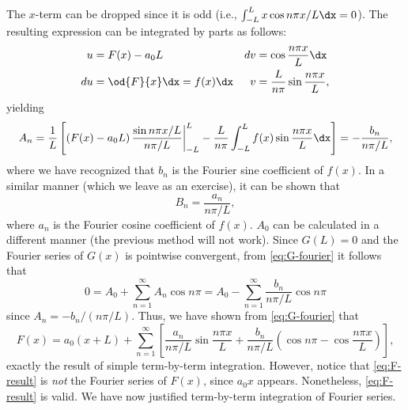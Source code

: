 The $x$-term can be dropped since it is odd (i.e., $\int_{-L}^{L} x\cos n\pi x/L \dx = 0$).  The resulting expression can be integrated by parts as follows:
\begin{align*}
u &= F(x) - a_0 L & dv &= \cos\frac{n\pi x}{L}\dx \\
du &= \od{F}{x}\dx = f(x)\dx & v &= \frac{L}{n\pi}\sin\frac{n\pi x}{L},
\end{align*}
yielding
\begin{equation}
\label{eq:An-proof}
A_n = \frac{1}{L}\left[\left(F(x) - a_0 L\right)\frac{\sin n\pi x/L}{n\pi/L}\bigg|_{-L}^{L} - \frac{L}{n\pi}\int_{-L}^{L} f(x)\sin\frac{n\pi x}{L}\dx\right] = -\frac{b_n}{n\pi/L},
\end{equation}
where we have recognized that $b_n$ is the Fourier sine coefficient of $f(x)$.  In a similar manner (which we leave as an exercise), it can be shown that
\[
B_n = \frac{a_n}{n\pi/L},
\]
where $a_n$ is the Fourier cosine coefficient of $f(x)$.  $A_0$ can be calculated in a different manner (the previous method will not work).  Since $G(L) = 0$ and the Fourier series of $G(x)$ is pointwise convergent, from \eqref{eq:G-fourier} it follows that
\[
0 = A_0 + \sum_{n=1}^{\infty} A_n \cos n\pi = A_0 - \sum_{n=1}^{\infty}\frac{b_n}{n\pi/L}\cos n\pi
\]
since $A_n = -b_n/(n\pi/L)$.  Thus, we have shown from \eqref{eq:G-fourier} that
\begin{equation}
\label{eq:F-result}
F(x) = a_0(x+L) + \sum_{n=1}^{\infty}\left[\frac{a_n}{n\pi/L}\sin\frac{n\pi x}{L} + \frac{b_n}{n\pi/L}\left(\cos n\pi - \cos\frac{n\pi x}{L}\right)\right],
\end{equation}
exactly the result of simple term-by-term integration.  However, notice that \eqref{eq:F-result} is \textit{not} the Fourier series of $F(x)$, since $a_0 x$ appears.  Nonetheless, \eqref{eq:F-result} is valid.  We have now justified term-by-term integration of Fourier series.


